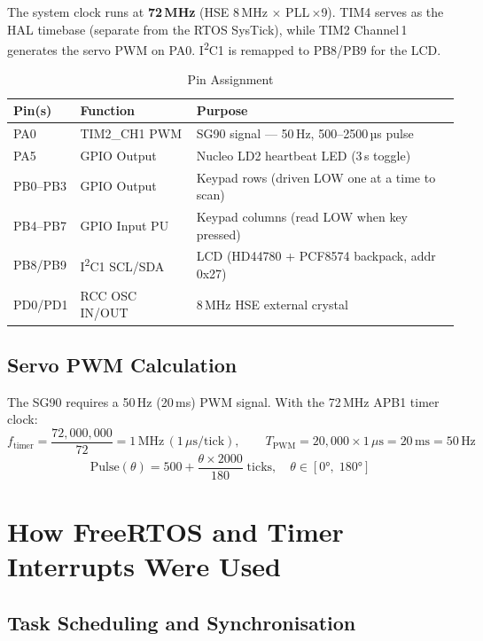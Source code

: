 \documentclass[11pt, a4paper]{article}
\begin{document}
The system clock runs at \textbf{72\,MHz} (HSE 8\,MHz $\times$ PLL\,$\times$9).
TIM4 serves as the HAL timebase (separate from the RTOS SysTick), while TIM2 Channel\,1
generates the servo PWM on PA0. I\textsuperscript{2}C1 is remapped to PB8/PB9 for the LCD.

\begin{table}[H]
\centering\small
\caption{Pin Assignment}
\begin{tabular}{C{1.6cm} C{2.8cm} L{8.0cm}}
\toprule
\textbf{Pin(s)} & \textbf{Function} & \textbf{Purpose} \\
\midrule
PA0      & TIM2\_CH1 PWM   & SG90 signal — 50\,Hz, 500–2500\,µs pulse \\
PA5      & GPIO Output     & Nucleo LD2 heartbeat LED (3\,s toggle) \\
PB0--PB3 & GPIO Output     & Keypad rows (driven LOW one at a time to scan) \\
PB4--PB7 & GPIO Input PU   & Keypad columns (read LOW when key pressed) \\
PB8/PB9  & I\textsuperscript{2}C1 SCL/SDA & LCD (HD44780 + PCF8574 backpack, addr 0x27) \\
PD0/PD1  & RCC OSC IN/OUT  & 8\,MHz HSE external crystal \\
\bottomrule
\end{tabular}
\end{table}

\subsection{Servo PWM Calculation}

The SG90 requires a 50\,Hz (20\,ms) PWM signal. With the 72\,MHz APB1 timer clock:
\[
  f_\text{timer} = \frac{72{,}000{,}000}{72} = 1\,\text{MHz}\,(1\,\mu\text{s/tick}),
  \qquad
  T_\text{PWM} = 20{,}000 \times 1\,\mu\text{s} = 20\,\text{ms} = 50\,\text{Hz}
\]
\[
  \text{Pulse}(\theta) = 500 + \frac{\theta \times 2000}{180}\;\text{ticks},
  \quad \theta \in [0°,\;180°]
\]

\section{How FreeRTOS and Timer Interrupts Were Used}

\subsection{Task Scheduling and Synchronisation}
\end{document}
